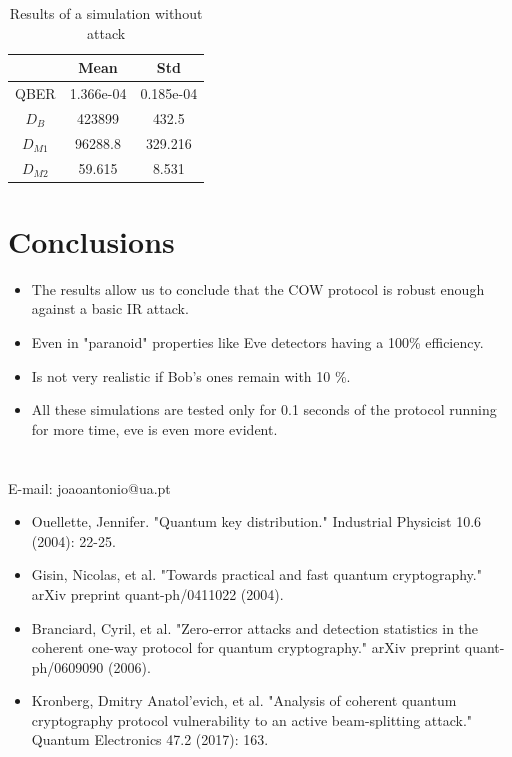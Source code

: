 \documentclass[1000pt]{article}
\newcommand{\mysection}[1]{\section*{\color{black}\sffamily #1}}%
\begin{document}
\begin{table}[hbt!]
	\centering
	\begin{tabular}{c|c|c|}
		\cline{2-3}
		& Mean & Std \\ \hline
		\multicolumn{1}{|c|}{QBER} & 1.366e-04 & 0.185e-04 \\ \hline
		\multicolumn{1}{|c|}{ $D_B$} & 423899 & 432.5 \\ \hline
		\multicolumn{1}{|c|}{ $D_{M1}$} & 96288.8 & 329.216 \\ \hline
		\multicolumn{1}{|c|}{ $D_{M2}$} & 59.615 & 8.531 \\ \hline
	\end{tabular}
	\caption{Results of a simulation without attack}
	\label{No IR}
\end{table}

\mysection{\Huge\textbf{Conclusions}} \LARGE \vspace*{1cm}
\begin{itemize}

\item The results allow us to conclude that the COW protocol is robust enough against a basic IR attack.

\item Even in "paranoid" properties like Eve detectors having a 100\% efficiency.

\item Is not very realistic if Bob's ones remain with 10 \%.

\item All these simulations are tested only for 0.1 seconds of the protocol running for more time, eve is even more evident.

\end{itemize}
\mysection{} \sffamily \Large
\vspace{-10mm}
\centerline{E-mail: joaoantonio@ua.pt}
\vspace*{7cm}
\begin{itemize}
	\item Ouellette, Jennifer. "Quantum key distribution." Industrial Physicist 10.6 (2004): 22-25.
	\item Gisin, Nicolas, et al. "Towards practical and fast quantum cryptography." arXiv preprint quant-ph/0411022 (2004).
	\item Branciard, Cyril, et al. "Zero-error attacks and detection statistics in the coherent one-way protocol for quantum cryptography." arXiv preprint quant-ph/0609090 (2006).
	\item Kronberg, Dmitry Anatol'evich, et al. "Analysis of coherent quantum cryptography protocol vulnerability to an active beam-splitting attack." Quantum Electronics 47.2 (2017): 163.
\end{itemize}
\end{document}
